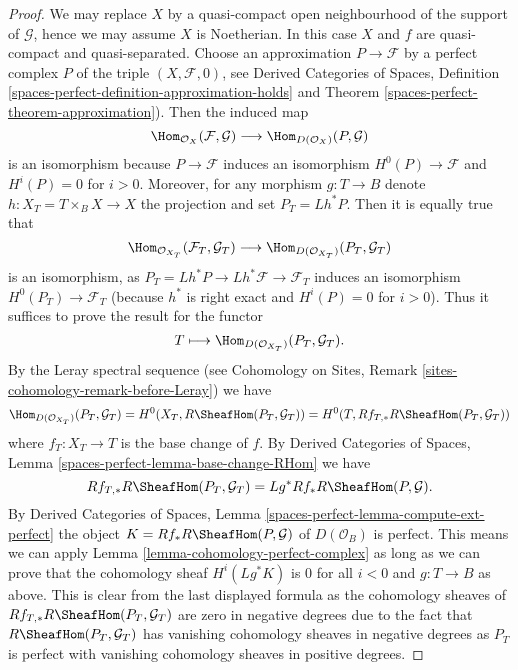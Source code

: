 \begin{proof}
We may replace $X$ by a quasi-compact open neighbourhood of
the support of $\mathcal{G}$, hence we may assume $X$ is Noetherian.
In this case $X$ and $f$ are quasi-compact and quasi-separated.
Choose an approximation $P \to \mathcal{F}$ by a perfect complex $P$ of
the triple $(X, \mathcal{F}, 0)$, see
Derived Categories of Spaces, Definition
\ref{spaces-perfect-definition-approximation-holds} and
Theorem \ref{spaces-perfect-theorem-approximation}).
Then the induced map
$$
\Hom_{\mathcal{O}_X}(\mathcal{F}, \mathcal{G})
\longrightarrow
\Hom_{D(\mathcal{O}_X)}(P, \mathcal{G})
$$
is an isomorphism because $P \to \mathcal{F}$ induces an isomorphism
$H^0(P) \to \mathcal{F}$ and $H^i(P) = 0$ for $i > 0$.
Moreover, for any morphism $g : T \to B$
denote $h : X_T = T \times_B X \to X$ the projection and set
$P_T = Lh^*P$. Then it is equally true that
$$
\Hom_{\mathcal{O}_{X_T}}(\mathcal{F}_T, \mathcal{G}_T)
\longrightarrow
\Hom_{D(\mathcal{O}_{X_T})}(P_T, \mathcal{G}_T)
$$
is an isomorphism, as $P_T = Lh^*P \to Lh^*\mathcal{F} \to \mathcal{F}_T$
induces an isomorphism $H^0(P_T) \to \mathcal{F}_T$ (because $h^*$ is
right exact and $H^i(P) = 0$ for $i > 0$). Thus it suffices to prove the
result for the functor
$$
T \longmapsto \Hom_{D(\mathcal{O}_{X_T})}(P_T, \mathcal{G}_T).
$$
By the Leray spectral sequence (see Cohomology on Sites, Remark
\ref{sites-cohomology-remark-before-Leray}) we have
$$
\Hom_{D(\mathcal{O}_{X_T})}(P_T, \mathcal{G}_T) =
H^0(X_T, R\SheafHom(P_T, \mathcal{G}_T)) =
H^0(T, Rf_{T, *}R\SheafHom(P_T, \mathcal{G}_T))
$$
where $f_T : X_T \to T$ is the base change of $f$. By
Derived Categories of Spaces, Lemma
\ref{spaces-perfect-lemma-base-change-RHom}
we have
$$
Rf_{T, *}R\SheafHom(P_T, \mathcal{G}_T) = Lg^*Rf_*R\SheafHom(P, \mathcal{G}).
$$
By
Derived Categories of Spaces, Lemma
\ref{spaces-perfect-lemma-compute-ext-perfect}
the object $K = Rf_*R\SheafHom(P, \mathcal{G})$ of $D(\mathcal{O}_B)$
is perfect. This means we can apply
Lemma \ref{lemma-cohomology-perfect-complex}
as long as we can prove that the cohomology sheaf
$H^i(Lg^*K)$ is $0$ for all $i < 0$ and $g : T \to B$ as above.
This is clear from the last displayed formula as
the cohomology sheaves of
$Rf_{T, *}R\SheafHom(P_T, \mathcal{G}_T)$
are zero in negative degrees
due to the fact that $R\SheafHom(P_T, \mathcal{G}_T)$ has vanishing
cohomology sheaves in negative degrees as $P_T$ is perfect with
vanishing cohomology sheaves in positive degrees.
\end{proof}

